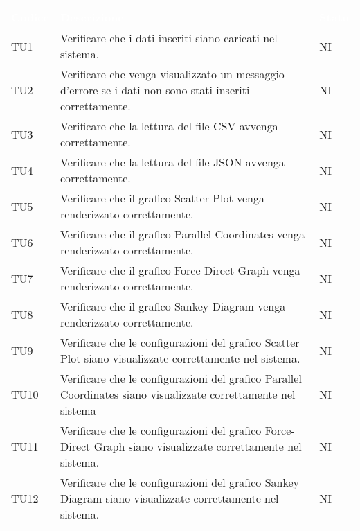     \begin{center}
        \renewcommand\arraystretch{1.5}
        \centering
        \begin{longtable}{|p{1.5cm}|p{11cm}|p{1cm}|}
        \hline
        \rowcolor[HTML]{036400}
        \textcolor{white}{\textbf{Codice}} & \textcolor{white}{\textbf{Descrizione}} & \textcolor{white}{\textbf{Stato}} \\ \hline
            \rowcolor[HTML]{EFEFEF}
            TU1 & Verificare che i dati inseriti siano caricati nel sistema. & NI\\ \hline
            \rowcolor[HTML]{C0C0C0}
            TU2 & Verificare che venga visualizzato un messaggio d'errore se i dati non sono stati inseriti correttamente. & NI\\ \hline
            \rowcolor[HTML]{EFEFEF}
            TU3 & Verificare che la lettura del file CSV avvenga correttamente. & NI\\ \hline
            \rowcolor[HTML]{C0C0C0}
            TU4 & Verificare che la lettura del file JSON avvenga correttamente. & NI\\ \hline
            \rowcolor[HTML]{C0C0C0}
            TU5 & Verificare che il grafico Scatter Plot venga renderizzato correttamente. & NI\\ \hline
            \rowcolor[HTML]{EFEFEF}
            TU6 & Verificare che il grafico Parallel Coordinates venga renderizzato correttamente. & NI\\ \hline
            \rowcolor[HTML]{C0C0C0}
            TU7 & Verificare che il grafico Force-Direct Graph venga renderizzato correttamente. & NI\\ \hline
            \rowcolor[HTML]{EFEFEF}
            TU8 & Verificare che il grafico Sankey Diagram venga renderizzato correttamente. & NI\\ \hline
            \rowcolor[HTML]{C0C0C0}
            TU9 & Verificare che le configurazioni del grafico Scatter Plot siano visualizzate correttamente nel sistema. & NI\\ \hline
            \rowcolor[HTML]{EFEFEF}
            TU10 & Verificare che le configurazioni del grafico Parallel Coordinates siano visualizzate correttamente nel sistema & NI\\ \hline
            \rowcolor[HTML]{C0C0C0}
            TU11 & Verificare che le configurazioni del grafico Force-Direct Graph siano visualizzate correttamente nel sistema. & NI\\ \hline
            \rowcolor[HTML]{EFEFEF}
            TU12 & Verificare che le configurazioni del grafico Sankey Diagram siano visualizzate correttamente nel sistema. & NI\\ \hline

\end{longtable}
\end{center}
